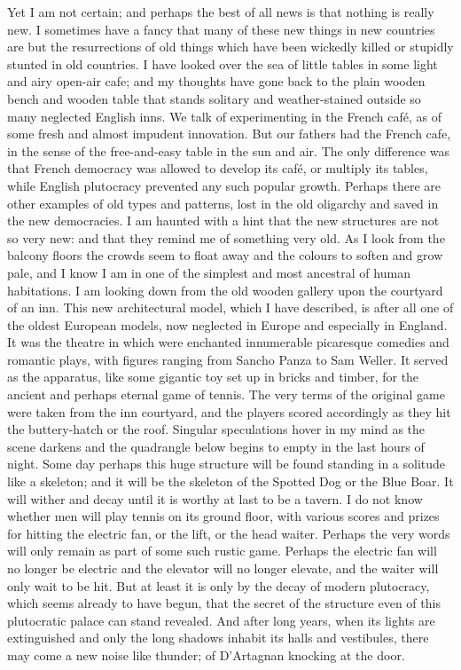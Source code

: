 \documentclass{book}
\begin{document}
Yet I am not certain; and perhaps the best of all news is that nothing is really new. I sometimes have a fancy that many of these new things in new countries are but the resurrections of old things which have been wickedly killed or stupidly stunted in old countries. I have looked over the sea of little tables in some light and airy open-air cafe; and my thoughts have gone back to the plain wooden bench and wooden table that stands solitary and weather-stained outside so many neglected English inns. We talk of experimenting in the French café, as of some fresh and almost impudent innovation. But our fathers had the French cafe, in the sense of the free-and-easy table in the sun and air. The only difference was that French democracy was allowed to develop its café, or multiply its tables, while English plutocracy prevented any such popular growth. Perhaps there are other examples of old types and patterns, lost in the old oligarchy and saved in the new democracies. I am haunted with a hint that the new structures are not so very new: and that they remind me of something very old. As I look from the balcony floors the crowds seem to float away and the colours to soften and grow pale, and I know I am in one of the simplest and most ancestral of human habitations. I am looking down from the old wooden gallery upon the courtyard of an inn. This new architectural model, which I have described, is after all one of the oldest European models, now neglected in Europe and especially in England. It was the theatre in which were enchanted innumerable picaresque comedies and romantic plays, with figures ranging from Sancho Panza to Sam Weller. It served as the apparatus, like some gigantic toy set up in bricks and timber, for the ancient and perhaps eternal game of tennis. The very terms of the original game were taken from the inn courtyard, and the players scored accordingly as they hit the buttery-hatch or the roof. Singular speculations hover in my mind as the scene darkens and the quadrangle below begins to empty in the last hours of night. Some day perhaps this huge structure will be found standing in a solitude like a skeleton; and it will be the skeleton of the Spotted Dog or the Blue Boar. It will wither and decay until it is worthy at last to be a tavern. I do not know whether men will play tennis on its ground floor, with various scores and prizes for hitting the electric fan, or the lift, or the head waiter. Perhaps the very words will only remain as part of some such rustic game. Perhaps the electric fan will no longer be electric and the elevator will no longer elevate, and the waiter will only wait to be hit. But at least it is only by the decay of modern plutocracy, which seems already to have begun, that the secret of the structure even of this plutocratic palace can stand revealed. And after long years, when its lights are extinguished and only the long shadows inhabit its halls and vestibules, there may come a new noise like thunder; of D’Artagnan knocking at the door.
\end{document}
